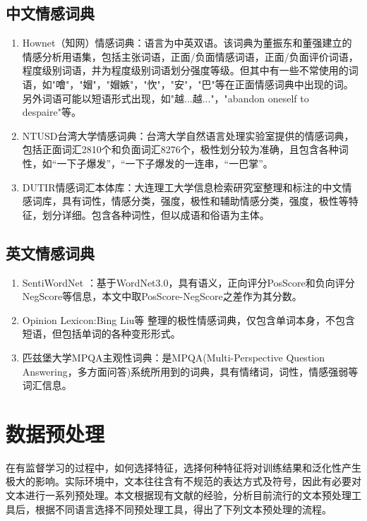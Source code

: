 \subsection{中文情感词典}
\begin{enumerate}
\item Hownet（知网）情感词典\cite{hownet}：语言为中英双语。该词典为董振东和董强建立的情感分析用语集，包括主张词语，正面/负面情感词语，正面/负面评价词语，程度级别词语，并为程度级别词语划分强度等级。但其中有一些不常使用的词语，如"噲"，"媢"，"媢嫉"，"忺"，"安"，"巴"等在正面情感词典中出现的词。另外词语可能以短语形式出现，如"越...越..."，"abandon oneself to despaire"等。
\item NTUSD台湾大学情感词典\cite{ntusd}：台湾大学自然语言处理实验室提供的情感词典，包括正面词汇2810个和负面词汇8276个，极性划分较为准确，且包含各种词性，如“一下子爆发”，“一下子爆发的一连串，“一巴掌”。
\item DUTIR情感词汇本体库\cite{dutir}：大连理工大学信息检索研究室整理和标注的中文情感词库，具有词性，情感分类，强度，极性和辅助情感分类，强度，极性等特征，划分详细。包含各种词性，但以成语和俗语为主体。
\end{enumerate}
\subsection{英文情感词典}
\begin{enumerate}
\item SentiWordNet\cite{sentiwordnet} \cite{sentiwordnet3}：基于WordNet3.0，具有语义，正向评分PosScore和负向评分NegScore等信息，本文中取PosScore-NegScore之差作为其分数。
\item Opinion Lexicon:Bing Liu等\cite{huliu2004a} \cite{huliu05a} 整理的极性情感词典，仅包含单词本身，不包含短语，但包括单词的各种变形形式。
\item 匹兹堡大学MPQA主观性词典\cite{mpqa}：是MPQA(Multi-Perspective Question Answering，多方面问答)系统所用到的词典，具有情绪词，词性，情感强弱等词汇信息。
\end{enumerate}

\section{数据预处理}
在有监督学习的过程中，如何选择特征，选择何种特征将对训练结果和泛化性产生极大的影响。实际环境中，文本往往含有不规范的表达方式及符号，因此有必要对文本进行一系列预处理。本文根据现有文献的经验，分析目前流行的文本预处理工具后，根据不同语言选择不同预处理工具，得出了下列文本预处理的流程。

